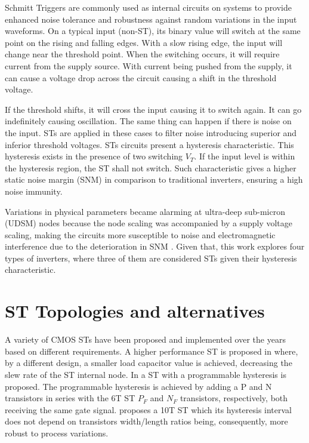 \documentclass[pgmicro,diss,english]{iiufrgs}
\begin{document}
Schmitt Triggers are commonly used as internal circuits on systems to provide enhanced noise tolerance and robustness against random variations in the input waveforms. On a typical input (non-ST), its binary value will switch at the same point on the rising and falling edges. With a slow rising edge, the input will change near the threshold point. When the switching occurs, it will require current from the supply source. With current being pushed from the supply, it can cause a voltage drop across the circuit causing a shift in the threshold voltage.

If the threshold shifts, it will cross the input causing it to switch again. It can go indefinitely causing oscillation. The same thing can happen if there is noise on the input. STs are applied in these cases to filter noise introducing superior and inferior threshold voltages. STs circuits present a hysteresis characteristic. This hysteresis exists in the presence of two switching $V_T$. If the input level is within the hysteresis region, the ST shall not switch. Such characteristic gives a higher static noise margin (SNM) in comparison to traditional inverters, ensuring a high noise immunity.

 Variations in physical parameters became alarming at ultra-deep sub-micron (UDSM) nodes because the node scaling was accompanied by a supply voltage scaling, making the circuits more susceptible to noise and electromagnetic interference due to the deterioration in SNM \cite{pal2018circuit}. Given that, this work explores four types of inverters, where three of them are considered STs given their hysteresis characteristic.

 \section{ST Topologies and alternatives}

A variety of CMOS STs have been proposed and implemented over the years based on different requirements. A higher performance ST is proposed in \cite{steyaert1986novel} where, by a different design, a smaller load capacitor value is achieved, decreasing the slew rate of the ST internal node. In \cite{pfister1992novel} a ST with a programmable hysteresis is proposed. The programmable hysteresis is achieved by adding a P and N transistors in series with the 6T ST $P_F$ and $N_F$ transistors, respectively, both receiving the same gate signal. \cite{kim1993new} proposes a 10T ST which its hysteresis interval does not depend on transistors width/length ratios being, consequently, more robust to process variations.
\end{document}
